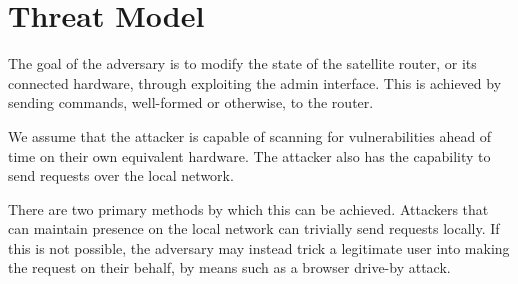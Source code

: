 \section{Threat Model}\label{sec:threat-model}

The goal of the adversary is to modify the state of the satellite router, or its connected hardware, through exploiting the admin interface.
This is achieved by sending commands, well-formed or otherwise, to the router.

We assume that the attacker is capable of scanning for vulnerabilities ahead of time on their own equivalent hardware.
The attacker also has the capability to send requests over the local network.

There are two primary methods by which this can be achieved.
Attackers that can maintain presence on the local network can trivially send requests locally.
If this is not possible, the adversary may instead trick a legitimate user into making the request on their behalf, by means such as a browser drive-by attack.